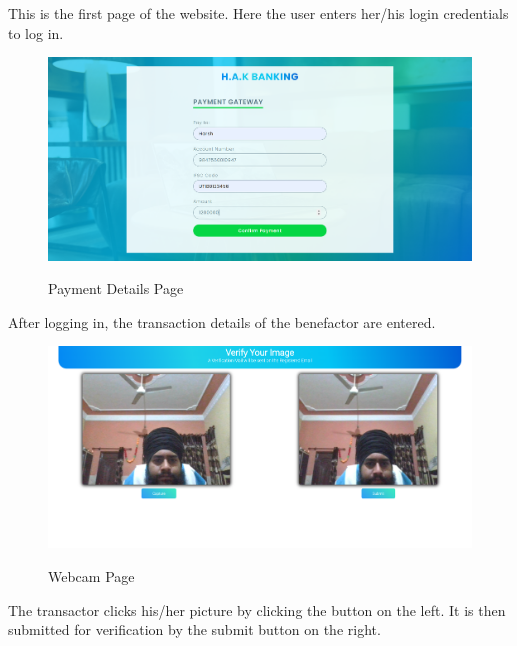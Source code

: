 \documentclass[12pt, oneside, a4paper]{article}
\begin{document}
This is the first page of the website. Here the user enters her/his login credentials to log in.
\vspace{0.7cm}

\begin{figure}[H]
\begin{center}
\includegraphics[width=1\textwidth]{Payment.png}\\
\caption{Payment Details Page}
\label{fig:Figure 8}
\end{center}
\end{figure}

After logging in, the transaction details of the benefactor are entered.

\pagebreak

\begin{figure}[H]
\begin{center}
\includegraphics[width=1\textwidth]{Webcam.png}\\
\caption{Webcam Page}
\label{fig:Figure 9}
\end{center}
\end{figure}

The transactor clicks his/her picture by clicking the button on the left. It is then submitted for verification by the submit button on the right.
\end{document}
